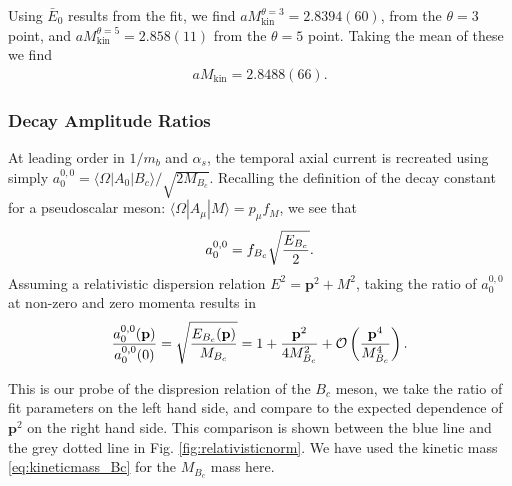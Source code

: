 Using $\bar{E}_0$ results from the fit, we find $aM_{\text{kin}}^{\theta=3} = 2.8394(60)$, from the $\theta=3$ point, and $aM_{\text{kin}}^{\theta=5} = 2.858(11)$ from the $\theta=5$ point. Taking the mean of these we find
\begin{align}
  aM_{\text{kin}} = 2.8488(66).
  \label{eq:kineticmass_Bc}
\end{align}

\subsubsection{Decay Amplitude Ratios}

At leading order in $1/m_b$ and $\alpha_s$, the temporal axial current is recreated using simply $a_0^{0,0} = \langle \Omega | A_0 | B_c \rangle /\sqrt{2M_{B_c}}$. Recalling the definition of the decay constant for a pseudoscalar meson: $\langle \Omega | A_{\mu} | M \rangle = p_{\mu} f_{M}$, we see that
\begin{align}
  a_0^{0,0} = f_{B_c}\sqrt{ E_{B_c} \over 2 }.
\end{align}
Assuming a relativistic dispersion relation $E^2={\textbf{p}}^2+M^2$, taking the ratio of $a_0^{0,0}$ at non-zero and zero momenta results in
\begin{align}
  {a_0^{0,0}({\textbf{p}})\over a_0^{0,0}(0)} = \sqrt{ E_{B_c}({\textbf{p}})\over M_{B_c}} = 1 + {{\textbf{p}}^2\over 4M_{B_c}^2} + \mathcal{O}\left( {\textbf{p}}^4\over M_{B_c}^4 \right).
\end{align}

This is our probe of the dispresion relation of the $B_c$ meson, we take the ratio of fit parameters on the left hand side, and compare to the expected dependence of ${\textbf{p}}^2$ on the right hand side. This comparison is shown between the blue line and the grey dotted line in Fig. \ref{fig:relativisticnorm}. We have used the kinetic mass \eqref{eq:kineticmass_Bc} for the $M_{B_c}$ mass here.

